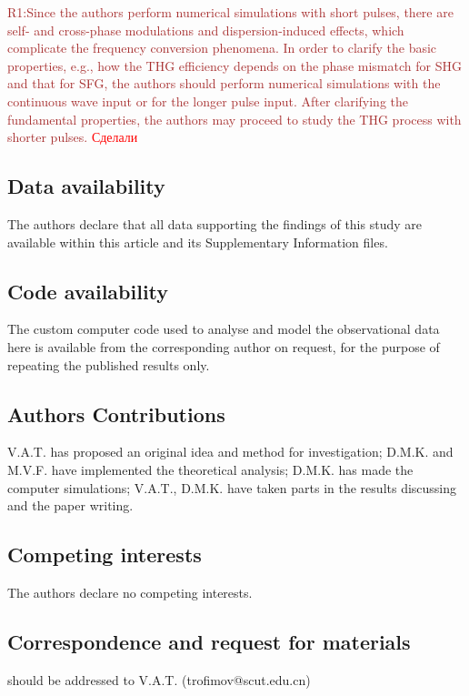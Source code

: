 \documentclass[a4paper, 12pt, onecolumn]{extarticle}
\begin{document}
 
 
\textcolor{brown}{R1:Since the authors perform numerical simulations with short pulses, there are self- and cross-phase modulations and dispersion-induced effects, which complicate the frequency conversion phenomena. In order to clarify the basic properties, e.g., how the THG efficiency depends on the phase mismatch for SHG and that for SFG, the authors should perform numerical simulations with the continuous wave input or for the longer pulse input. After clarifying the fundamental properties, the authors may proceed to study the THG process with shorter pulses.}
 \textcolor{red}{Сделали}


\subsection*{Data availability}
The authors declare that all data supporting the findings of this study are available
within this article and its Supplementary Information files.

\subsection*{Code availability}
The custom computer code used to analyse and model the observational data here is available from the corresponding author on request, for the purpose of repeating 
the published results only.

\subsection*{Authors Contributions}
V.A.T. has proposed an original idea and method for investigation; D.M.K. and M.V.F. have implemented the theoretical analysis; D.M.K. has made the computer simulations; V.A.T., D.M.K. have taken parts in the results discussing and the paper writing.

\subsection*{Competing interests}
The authors declare no competing interests.

\subsection*{Correspondence and request for materials}
should be addressed to V.A.T. (trofimov@scut.edu.cn)


\end{document}
